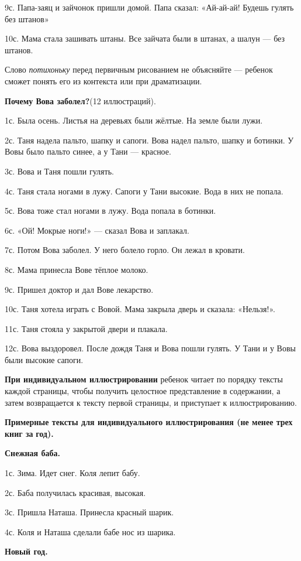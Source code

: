 \documentclass{book}
\renewcommand{\emph}[1]{\textit{#1}}
\begin{document}
9с. Папа-заяц и зайчонок пришли домой. Папа сказал: «Ай-ай-ай! Будешь
гулять без штанов»

10с. Мама стала зашивать штаны. Все зайчата были в штанах, а шалун ---
без штанов.

Слово \emph{потихоньку} перед первичным рисованием не объясняйте ---
ребенок сможет понять его из контекста или при драматизации.

\textbf{Почему Вова заболел?}(12 иллюстраций).

1с. Была осень. Листья на деревьях были жёлтые. На земле были лужи.

2с. Таня надела пальто, шапку и сапоги. Вова надел пальто, шапку и
ботинки. У Вовы было пальто синее, а у Тани --- красное.

3с. Вова и Таня пошли гулять.

4с. Таня стала ногами в лужу. Сапоги у Тани высокие. Вода в них не
попала.

5с. Вова тоже стал ногами в лужу. Вода попала в ботинки.

6с. «Ой! Мокрые ноги!» --- сказал Вова и заплакал.

7с. Потом Вова заболел. У него болело горло. Он лежал в кровати.

8с. Мама принесла Вове тёплое молоко.

9с. Пришел доктор и дал Вове лекарство.

10с. Таня хотела играть с Вовой. Мама закрыла дверь и сказала:
«Нельзя!».

11с. Таня стояла у закрытой двери и плакала.

12с. Вова выздоровел. После дождя Таня и Вова пошли гулять. У Тани и у
Вовы были высокие сапоги.

\textbf{При индивидуальном иллюстрировании} ребенок читает по порядку
тексты каждой страницы, чтобы получить целостное представление в
содержании, а затем возвращается к тексту первой страницы, и приступает
к иллюстрированию.

\textbf{Примерные тексты для индивидуального иллюстрирования (не менее
трех книг за} \textbf{год).}

\textbf{Снежная баба.}

1с. Зима. Идет снег. Коля лепит бабу.

2с. Баба получилась красивая, высокая.

3с. Пришла Наташа. Принесла красный шарик.

4с. Коля и Наташа сделали бабе нос из шарика.

\textbf{Новый год.}
\end{document}
